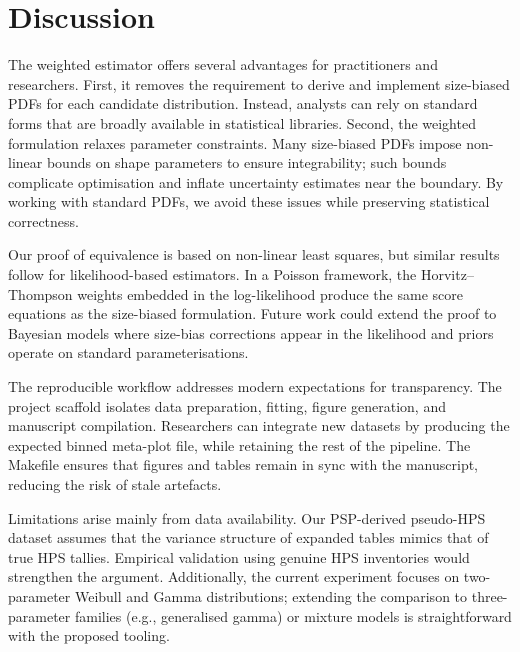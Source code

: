 \section{Discussion}

The weighted estimator offers several advantages for practitioners and
researchers. First, it removes the requirement to derive and implement
size-biased PDFs for each candidate distribution. Instead, analysts can rely on
standard forms that are broadly available in statistical libraries. Second, the
weighted formulation relaxes parameter constraints. Many size-biased PDFs
impose non-linear bounds on shape parameters to ensure integrability; such
bounds complicate optimisation and inflate uncertainty estimates near the
boundary. By working with standard PDFs, we avoid these issues while preserving
statistical correctness.

Our proof of equivalence is based on non-linear least squares, but similar
results follow for likelihood-based estimators. In a Poisson framework, the
Horvitz--Thompson weights embedded in the log-likelihood produce the same score
equations as the size-biased formulation. Future work could extend the proof to
Bayesian models where size-bias corrections appear in the likelihood and priors
operate on standard parameterisations.

The reproducible workflow addresses modern expectations for transparency. The
project scaffold isolates data preparation, fitting, figure generation, and
manuscript compilation. Researchers can integrate new datasets by producing the
expected binned meta-plot file, while retaining the rest of the pipeline. The
Makefile ensures that figures and tables remain in sync with the manuscript,
reducing the risk of stale artefacts.

Limitations arise mainly from data availability. Our PSP-derived pseudo-HPS
dataset assumes that the variance structure of expanded tables mimics that of
true HPS tallies. Empirical validation using genuine HPS inventories would
strengthen the argument. Additionally, the current experiment focuses on
two-parameter Weibull and Gamma distributions; extending the comparison to
three-parameter families (e.g., generalised gamma) or mixture models is
straightforward with the proposed tooling.
